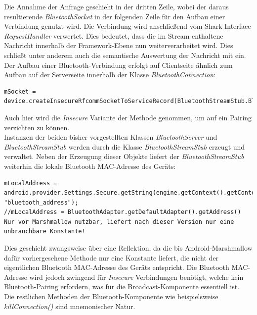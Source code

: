 Die Annahme der Anfrage geschieht in der dritten Zeile, wobei der daraus resultierende \textit{BluetoothSocket} in der folgenden Zeile für den Aufbau einer Verbindung genutzt wird. Die Verbindung wird anschließend vom Shark-Interface \textit{RequestHandler} verwertet. Dies bedeutet, dass die im Stream enthaltene Nachricht innerhalb der Framework-Ebene nun weiterverarbeitet wird. Dies schließt unter anderem auch die semantische Auswertung der Nachricht mit ein.\newpage
Der Aufbau einer Bluetooth-Verbindung erfolgt auf Clientseite ähnlich zum Aufbau auf der Serverseite innerhalb der Klasse \textit{BluetoothConnection}:\newline
 \lstset{language=Java, caption=Clientseitige Initialisierung des Sockets, label=DescriptiveLabel, numbers=left, numbersep=1em, breaklines=true, basicstyle=\small}
\begin{lstlisting}
mSocket = device.createInsecureRfcommSocketToServiceRecord(BluetoothStreamStub.BT_UUID)
\end{lstlisting}
Auch hier wird die \textit{Insecure} Variante der Methode genommen, um auf ein Pairing verzichten zu können.
\\Instanzen der beiden bisher vorgestellten Klassen \textit{BluetoothServer} und \textit{BluetoothStreamStub} werden durch die Klasse \textit{BluetoothStreamStub} erzeugt und verwaltet. Neben der Erzeugung dieser Objekte liefert der \textit{BluetoothStreamStub} weiterhin die lokale Bluetooth MAC-Adresse des Geräts:\newline
\lstset{language=Java, caption=Auslesen der Bluetooth MAC-Adresse, label=DescriptiveLabel, numbers=left, numbersep=1em, breaklines=true, basicstyle=\small}
\begin{lstlisting}
mLocalAddress = android.provider.Settings.Secure.getString(engine.getContext().getContentResolver(), "bluetooth_address");
//mLocalAddress = BluetoothAdapter.getDefaultAdapter().getAddress() Nur vor Marshmallow nutzbar, liefert nach dieser Version nur eine unbrauchbare Konstante!
\end{lstlisting}
Dies geschieht zwangsweise über eine Reflektion, da die bis Android-Marshmallow dafür vorhergesehene Methode nur eine Konstante liefert, die nicht der eigentlichen Bluetooth MAC-Adresse des Geräts entspricht. Die Bluetooth MAC-Adresse wird jedoch zwingend für \textit{Insecure} Verbindungen benötigt, welche kein Bluetooth-Pairing erfordern, was für die Broadcast-Komponente essentiell ist. 
\\Die restlichen Methoden der Bluetooth-Komponente wie beispielsweise \textit{killConnection()} sind mnemonischer Natur.
\newpage
